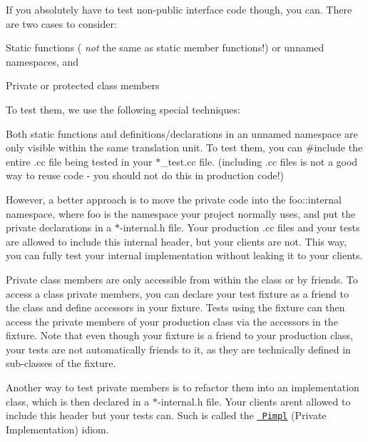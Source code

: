 If you absolutely have to test non-\/public interface code though, you can. There are two cases to consider\+:


\begin{DoxyItemize}
\item Static functions ( {\itshape not} the same as static member functions!) or unnamed namespaces, and
\item Private or protected class members
\end{DoxyItemize}

To test them, we use the following special techniques\+:


\begin{DoxyItemize}
\item Both static functions and definitions/declarations in an unnamed namespace are only visible within the same translation unit. To test them, you can {\ttfamily \#include} the entire {\ttfamily .cc} file being tested in your {\ttfamily $\ast$\+\_\+test.cc} file. (including {\ttfamily .cc} files is not a good way to reuse code -\/ you should not do this in production code!)

However, a better approach is to move the private code into the {\ttfamily foo\+::internal} namespace, where {\ttfamily foo} is the namespace your project normally uses, and put the private declarations in a {\ttfamily $\ast$-\/internal.h} file. Your production {\ttfamily .cc} files and your tests are allowed to include this internal header, but your clients are not. This way, you can fully test your internal implementation without leaking it to your clients.
\item Private class members are only accessible from within the class or by friends. To access a class\textquotesingle{} private members, you can declare your test fixture as a friend to the class and define accessors in your fixture. Tests using the fixture can then access the private members of your production class via the accessors in the fixture. Note that even though your fixture is a friend to your production class, your tests are not automatically friends to it, as they are technically defined in sub-\/classes of the fixture.

Another way to test private members is to refactor them into an implementation class, which is then declared in a {\ttfamily $\ast$-\/internal.h} file. Your clients aren\textquotesingle{}t allowed to include this header but your tests can. Such is called the \href{https://www.gamedev.net/articles/programming/general-and-gameplay-programming/the-c-pimpl-r1794/}{\texttt{ Pimpl}} (Private Implementation) idiom.


\end{DoxyItemize}
